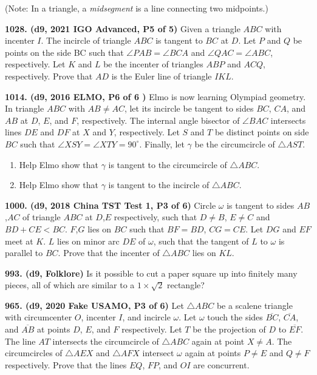 \documentclass{article}
\begin{document}
(Note: In a triangle, a \emph{midsegment} is a line connecting two midpoints.)

\textbf{1028. (\color{red}d9\color{black}, 2021 IGO Advanced, P5 of 5)} Given a triangle $ABC$ with incenter $I$. The incircle of triangle $ABC$ is tangent to $BC$ at $D$. Let $P$ and $Q$ be points on the side BC such that $\angle PAB = \angle BCA$ and $\angle QAC = \angle ABC$, respectively. Let $K$ and $L$ be the incenter of triangles $ABP$ and $ACQ$, respectively. Prove that $AD$ is the Euler line of triangle $IKL$.

\textbf{1014. (\color{red}d9\color{black}, 2016 ELMO, P6 of 6 )} Elmo is now learning Olympiad geometry. In triangle $ABC$ with $AB\neq AC$, let its incircle be tangent to sides $BC$, $CA$, and $AB$ at $D$, $E$, and $F$, respectively. The internal angle bisector of $\angle BAC$ intersects lines $DE$ and $DF$ at $X$ and $Y$, respectively. Let $S$ and $T$ be distinct points on side $BC$ such that $\angle XSY=\angle XTY=90^\circ$. Finally, let $\gamma$ be the circumcircle of $\triangle AST$.
\begin{enumerate}
    \item Help Elmo show that $\gamma$ is tangent to the circumcircle of $\triangle ABC$.
    \item Help Elmo show that $\gamma$ is tangent to the incircle of $\triangle ABC$.
\end{enumerate}

\textbf{1000. (\color{red}d9\color{black}, 2018 China TST Test 1, P3 of 6)} Circle $\omega$ is tangent to sides $AB$,$AC$ of triangle $ABC$ at $D$,$E$ respectively, such that $D\neq B$, $E\neq C$ and $BD+CE<BC$. $F$,$G$ lies on $BC$ such that $BF=BD$, $CG=CE$. Let $DG$ and $EF$ meet at $K$. $L$ lies on minor arc $DE$ of $\omega$, such that the tangent of $L$ to $\omega$ is parallel to $BC$. Prove that the incenter of $\triangle ABC$ lies on $KL$.

\textbf{993. (\color{red}d9\color{black}, Folklore)} Is it possible to cut a paper square up into finitely many pieces, all of which are similar to a $1 \times \sqrt 2$ rectangle?

\textbf{965. (\color{red}d9\color{black}, 2020 Fake USAMO, P3 of 6)} Let $\triangle ABC$ be a scalene triangle with circumcenter $O$, incenter $I$, and incircle $\omega$. Let $\omega$ touch the sides $\overline{BC}$, $\overline{CA}$, and $\overline{AB}$ at points $D$, $E$, and $F$ respectively. Let $T$ be the projection of $D$ to $\overline{EF}$. The line $AT$ intersects the circumcircle of $\triangle ABC$ again at point $X\ne A$. The circumcircles of $\triangle AEX$ and $\triangle AFX$ intersect $\omega$ again at points $P\ne E$ and $Q\ne F$ respectively. Prove that the lines $EQ$, $FP$, and $OI$ are concurrent.
\end{document}
